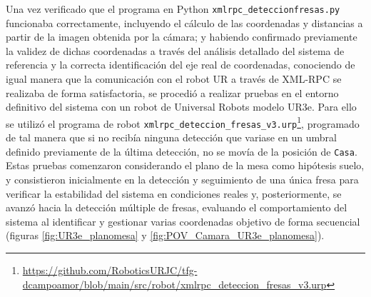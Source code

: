 Una vez verificado que el programa en Python \verb|xmlrpc_deteccionfresas.py| %
funcionaba correctamente, incluyendo el cálculo de las coordenadas y distancias a partir de la imagen obtenida por la cámara; y habiendo confirmado previamente la validez de dichas coordenadas a través del análisis detallado del sistema de referencia y la correcta identificación del eje real de coordenadas, conociendo de igual manera que la comunicación con el robot UR a través de XML-RPC se realizaba de forma satisfactoria, se procedió a realizar pruebas en el entorno definitivo del sistema con un robot de Universal Robots modelo UR3e. Para ello se utilizó el programa de robot \verb|xmlrpc_deteccion_fresas_v3.urp|\footnote{\url{https://github.com/RoboticsURJC/tfg-dcampoamor/blob/main/src/robot/xmlrpc_deteccion_fresas_v3.urp}}, programado de tal manera que si no recibía ninguna detección que variase en un umbral definido previamente de la última detección, no se movía de la posición de \texttt{Casa}. Estas pruebas comenzaron considerando el plano de la mesa como hipótesis suelo, y consistieron inicialmente en la detección y seguimiento de una única fresa para verificar la estabilidad del sistema en condiciones reales y, posteriormente, se avanzó hacia la detección múltiple de fresas, evaluando el comportamiento del sistema al identificar y gestionar varias coordenadas objetivo de forma secuencial (figuras \ref{fig:UR3e_planomesa} y \ref{fig:POV_Camara_UR3e_planomesa}).

